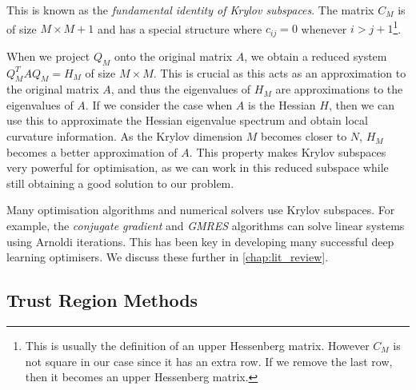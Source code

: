 This is known as the \textit{fundamental identity of Krylov subspaces}. The matrix $C_M$ is of size $M \times M+1$ and has a special structure where $c_{ij} = 0$ whenever $i > j + 1$\footnote{This is usually the definition of an upper Hessenberg matrix. However $C_M$ is not square in our case since it has an extra row. If we remove the last row, then it becomes an upper Hessenberg matrix.}.

When we project $Q_M$ onto the original matrix $A$, we obtain a reduced system $Q_M^T A Q_M = H_M$ of size $M \times M$. This is crucial as this acts as an approximation to the original matrix $A$, and thus the eigenvalues of $H_M$ are approximations to the eigenvalues of $A$. If we consider the case when $A$ is the Hessian $H$, then we can use this to approximate the Hessian eigenvalue spectrum and obtain local curvature information. As the Krylov dimension $M$ becomes closer to $N$, $H_M$ becomes a better approximation of $A$. This property makes Krylov subspaces very powerful for optimisation, as we can work in this reduced subspace while still obtaining a good solution to our problem.


Many optimisation algorithms and numerical solvers use Krylov subspaces. For example, the \textit{conjugate gradient} and \textit{GMRES} algorithms can solve linear systems using Arnoldi iterations. 
This has been key in developing many successful deep learning optimisers. We discuss these further in \cref{chap:lit_review}.

\subsection{Trust Region Methods}
\label{ssec:trust_region_methods}

